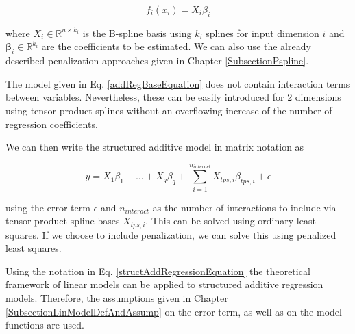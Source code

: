 \documentclass[10pt,a4paper]{article}
\begin{document}
$$f_i(x_i) = X_i \beta_i$$

where $X_i \in \mathbb R^{n \times k_i}$ is the B-spline basis using $k_i$ splines for input dimension $i$ and $\boldsymbol{\beta}_i \in \mathbb R^{k_i}$ are the coefficients to be estimated. We can also use the already described penalization approaches given in Chapter \ref{SubsectionPspline}. 

The model given in Eq. \ref{addRegBaseEquation} does not contain interaction terms between variables. Nevertheless, these can be easily introduced for 2 dimensions using tensor-product splines without an overflowing increase of the number of regression coefficients.

We can then write the structured additive model in matrix notation as 

\begin{equation} \label{structAddRegressionEquation}
	y = X_1\beta_1 + \dots + X_q\beta_q + \sum_{i=1}^{n_{interact}} X_{tps, i} \beta_{tps,i} + \epsilon
\end{equation}

using the error term $\epsilon$ and $n_{interact}$ as the number of interactions to include via tensor-product spline bases $X_{tps,i}$. This can be solved using ordinary least squares. If we choose to include penalization, we can solve this using penalized least squares. 

Using the notation in Eq. \ref{structAddRegressionEquation} the theoretical framework of linear models can be applied to structured additive regression models. Therefore, the assumptions given in Chapter \ref{SubsectionLinModelDefAndAssump} on the error term, as well as on the model functions are used. \cite{fahrmeir2004penalized}


\printbibliography
	
\end{document}
